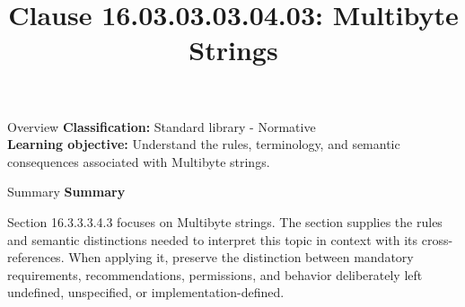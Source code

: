 \documentclass[10pt,letterpaper]{article}
\title{Clause 16.03.03.03.04.03: Multibyte Strings}
\author{}
\date{}
\begin{document}
\maketitle
\begin{CornellOverviewBox}{Overview}
\textbf{Classification:} Standard library - Normative\\[2pt]
\textbf{Learning objective:} Understand the rules, terminology, and semantic consequences associated with Multibyte strings.
\end{CornellOverviewBox}\begin{CornellSummaryBox}{Summary}
{\sffamily\bfseries\color{Accent} Summary}\par\vspace{3pt}Section 16.3.3.3.4.3 focuses on Multibyte strings. The section supplies the rules and semantic distinctions needed to interpret this topic in context with its cross-references. When applying it, preserve the distinction between mandatory requirements, recommendations, permissions, and behavior deliberately left undefined, unspecified, or implementation-defined.
\end{CornellSummaryBox}
\end{document}
